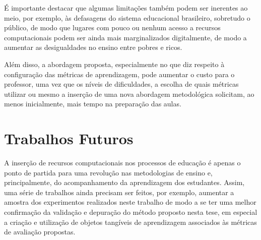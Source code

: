 É importante destacar que algumas limitações também podem ser inerentes ao meio, por exemplo, às defasagens do sistema educacional brasileiro, sobretudo o público, de modo que lugares com pouco ou nenhum acesso a recursos computacionais podem ser ainda mais marginalizados digitalmente, de modo a aumentar as desigualdades no ensino entre pobres e ricos. 

Além disso, a abordagem proposta, especialmente no que diz respeito à configuração das métricas de aprendizagem, pode aumentar o custo para o professor, uma vez que os níveis de dificuldades, a escolha de quais métricas utilizar ou mesmo a inserção de uma nova abordagem metodológica solicitam, ao menos inicialmente, mais tempo na preparação das aulas.


\section{Trabalhos Futuros}

A inserção de recursos computacionais nos processos de educação é apenas o ponto de partida para uma revolução nas metodologias de ensino e, principalmente, do acompanhamento da aprendizagem dos estudantes. Assim, uma série de trabalhos ainda precisam ser feitos, por exemplo, aumentar a amostra dos experimentos realizados neste trabalho de modo a se ter uma melhor confirmação da validação e depuração do método proposto nesta tese, em especial a criação e utilização de objetos tangíveis de aprendizagem associados às métricas de avaliação propostas.


